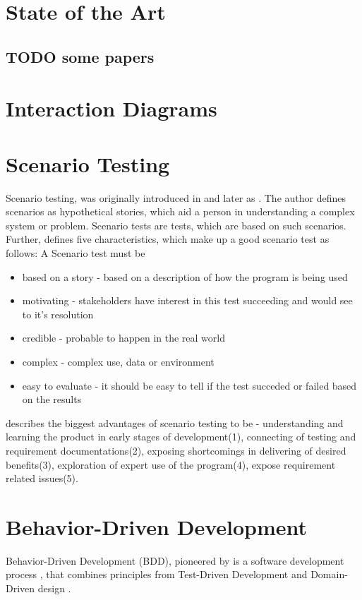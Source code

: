 \section{State of the Art}
\subsection{TODO some papers}

\section{Interaction Diagrams}
\section{Scenario Testing}
Scenario testing, was originally introduced in \textcite{kaner2003power} and later as \textcite{kaner2013introduction}. The author defines scenarios as hypothetical stories, which aid a person in understanding a complex system or problem. Scenario tests are tests, which are based on such scenarios.  \parencite[1]{kaner2013introduction}
Further, \parencite[2-5]{kaner2003power} defines five characteristics, which make up a good scenario test as follows:
A Scenario test must be
\begin{itemize}
     \item based on a story - based on a description of how the program is being used
    \item motivating - stakeholders have interest in this test succeeding and would see to it's resolution
    \item credible - probable to happen in the real world
    \item complex - complex use, data or environment
    \item easy to evaluate - it should be easy to tell if the test succeded or failed based on the results 
\end{itemize}

\textcite{kaner2013introduction} describes the biggest advantages of scenario testing to be  - understanding and learning the product in early stages of development(1), connecting of testing and requirement documentations(2), exposing shortcomings in delivering of desired benefits(3), exploration of expert use of the program(4), expose requirement related issues(5).

\section{Behavior-Driven Development}
Behavior-Driven Development (BDD), pioneered by  \textcite{north2006behavior} is a software development
process , that combines principles from Test-Driven Development and Domain-Driven design \parencite{evans2004domain}.

